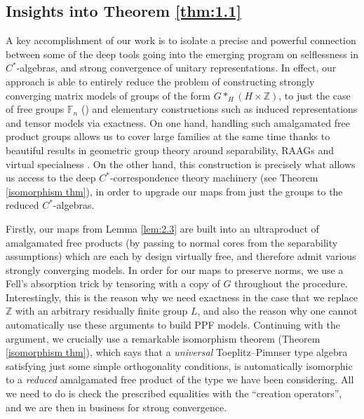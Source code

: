 \documentclass[10pt]{amsart}
\theoremstyle{definition}
\begin{document}
\subsection*{Insights into Theorem \ref{thm:1.1}} 
A key accomplishment of our work is to isolate a precise and powerful connection between some of the deep tools going into the emerging program on selflessness in $C^*$-algebras, and strong convergence of unitary representations. In effect, our approach is able to entirely reduce the problem of constructing strongly converging matrix models of groups of the form $G*_{H}(H\times \mathbb{Z})$, to just the case of free groups $\mathbb{F}_n$ (\cite{HaagerupThorbjornsen2005, BordenaveCollins2019}) and elementary constructions such as induced representations and tensor models via exactness. On one hand, handling such amalgamated free product groups allows us to cover large families at the same time thanks to beautiful results in geometric group theory around separability, RAAGs and virtual specialness \cite{Agol2013, HaglundWise2008, Wilton2008Halls, HsuWise1999}. On the other hand, this construction is precisely what allows us access to the deep $C^*$-correspondence theory machinery (see Theorem \ref{isomorphism thm}), in order to upgrade our maps from just the groups to the reduced $C^*$-algebras. 

Firstly, our maps from Lemma \ref{lem:2.3} are built into an ultraproduct of amalgamated free products (by passing to normal cores from the separability assumptions) which are each by design virtually free, and therefore admit various strongly converging models. In order for our maps to preserve norms, we use a Fell's absorption trick by tensoring with a copy of $G$ throughout the procedure. Interestingly, this is the reason why we need exactness in the case that we replace $\mathbb{Z}$ with an arbitrary residually finite group $L$, and also the reason why one cannot automatically use these arguments to build PPF models. Continuing with the argument, we crucially use a remarkable isomorphism theorem (Theorem \ref{isomorphism thm}), which says that a \emph{universal} Toeplitz--Pimnser type algebra satisfying just some simple orthogonality conditions, is automatically isomorphic to a \emph{reduced} amalgamated free product of the type we have been considering. All we need to do is check the prescribed equalities with the ``creation operators'', and we are then in business for strong convergence. 
\end{document}
